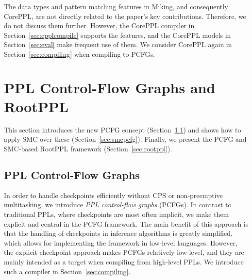 \documentclass[runningheads]{llncs}
\begin{document}
The data types and pattern matching features in Miking, and consequently CorePPL, are not directly related to the paper's key contributions.
Therefore, we do not discuss them further.
However, the CorePPL compiler in Section~\ref{sec:cpplcompile} supports the features, and the CorePPL models in Section~\ref{sec:eval} make frequent use of them.
We consider CorePPL again in Section~\ref{sec:compiling} when compiling to PCFGs.

\section{PPL Control-Flow Graphs and RootPPL}\label{sec:pcfgrootppl}
This section introduces the new PCFG concept (Section~\ref{sec:pcfg}) and shows how to apply SMC over these (Section~\ref{sec:smcpcfg}). Finally, we present the PCFG and SMC-based RootPPL framework (Section~\ref{sec:rootppl}).

\subsection{PPL Control-Flow Graphs}\label{sec:pcfg}
In order to handle checkpoints efficiently without CPS or non-preemptive multitasking, we introduce \emph{PPL control-flow graphs} (PCFGs).
In contrast to traditional PPLs, where checkpoints are most often implicit, we make them explicit and central in the PCFG framework.
The main benefit of this approach is that the handling of checkpoints in inference algorithms is greatly simplified, which allows for implementing the framework in low-level languages.
However, the explicit checkpoint approach makes PCFGs relatively low-level, and they are mainly intended as a target when compiling from high-level PPLs.
We introduce such a compiler in Section~\ref{sec:compiling}.
\end{document}
